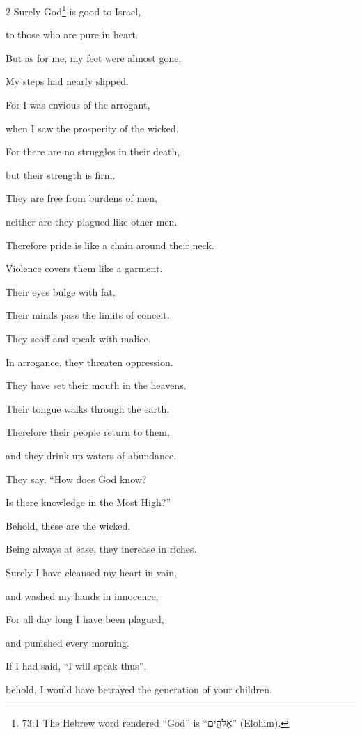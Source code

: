 \begin{multicols}{2}
	\quad \myverse*{}Surely God\footnote{73:1 The Hebrew word rendered “God” is “אֱלֹהִ֑ים” (Elohim).} is good to Israel,
	
	to those who are pure in heart.
	
	
	\myverse{}But as for me, my feet were almost gone.
	
	My steps had nearly slipped.
	
	
	\myverse{}For I was envious of the arrogant,
	
	when I saw the prosperity of the wicked.
	
	
	\myverse{}For there are no struggles in their death,
	
	but their strength is firm.
	
	
	\myverse{}They are free from burdens of men,
	
	neither are they plagued like other men.
	
	
	\myverse{}Therefore pride is like a chain around their neck.
	
	Violence covers them like a garment.
	
	
	\myverse{}Their eyes bulge with fat.
	
	Their minds pass the limits of conceit.
	
	
	\myverse{}They scoff and speak with malice.
	
	In arrogance, they threaten oppression.
	
	
	\myverse{}They have set their mouth in the heavens.
	
	Their tongue walks through the earth.
	
	
	\myverse{}Therefore their people return to them,
	
	and they drink up waters of abundance.
	
	
	\myverse{}They say, “How does God know?
	
	Is there knowledge in the Most High?”
	
	
	\myverse{}Behold, these are the wicked.
	
	Being always at ease, they increase in riches.
	
	
	\myverse{}Surely I have cleansed my heart in vain,
	
	and washed my hands in innocence,
	
	
	\myverse{}For all day long I have been plagued,
	
	and punished every morning.
	
	
	\myverse{}If I had said, “I will speak thus”,
	
	behold, I would have betrayed the generation of your children.
	

\end{multicols}
